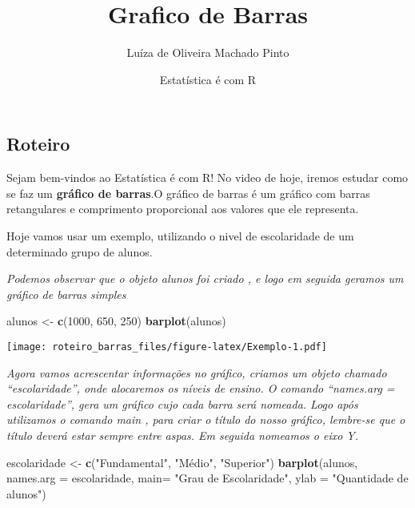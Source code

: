 \documentclass[]{article}
\title{Grafico de Barras}
\author{Luíza de Oliveira Machado Pinto}
\date{Estatística é com R}
\newenvironment{Shaded}{\begin{snugshade}}{\end{snugshade}}
\newcommand{\DataTypeTok}[1]{\textcolor[rgb]{0.13,0.29,0.53}{#1}}
\newcommand{\DecValTok}[1]{\textcolor[rgb]{0.00,0.00,0.81}{#1}}
\newcommand{\KeywordTok}[1]{\textcolor[rgb]{0.13,0.29,0.53}{\textbf{#1}}}
\newcommand{\NormalTok}[1]{#1}
\newcommand{\StringTok}[1]{\textcolor[rgb]{0.31,0.60,0.02}{#1}}
\begin{document}
\maketitle

\hypertarget{roteiro}{%
\subsection{Roteiro}\label{roteiro}}

Sejam bem-vindos ao Estatística é com R! No video de hoje, iremos
estudar como se faz um \textbf{gráfico de barras}.O gráfico de barras é
um gráfico com barras retangulares e comprimento proporcional aos
valores que ele representa.

Hoje vamos usar um exemplo, utilizando o nivel de escolaridade de um
determinado grupo de alunos.

\emph{Podemos observar que o objeto alunos foi criado , e logo em
seguida geramos um gráfico de barras simples}

\begin{Shaded}
\begin{Highlighting}[]
\NormalTok{alunos <-}\StringTok{ }\KeywordTok{c}\NormalTok{(}\DecValTok{1000}\NormalTok{, }\DecValTok{650}\NormalTok{, }\DecValTok{250}\NormalTok{)}
\KeywordTok{barplot}\NormalTok{(alunos)}
\end{Highlighting}
\end{Shaded}

\texttt{[image: roteiro\_barras\_files/figure-latex/Exemplo-1.pdf]}

\emph{Agora vamos acrescentar informações no gráfico, criamos um objeto
chamado ``escolaridade'', onde alocaremos os níveis de ensino. O comando
``names.arg = escolaridade'', gera um gráfico cujo cada barra será
nomeada. Logo após utilizamos o comando main , para criar o título do
nosso gráfico, lembre-se que o título deverá estar sempre entre aspas.
Em seguida nomeamos o eixo Y.}

\begin{Shaded}
\begin{Highlighting}[]
\NormalTok{escolaridade <-}\StringTok{ }\KeywordTok{c}\NormalTok{(}\StringTok{"Fundamental"}\NormalTok{, }\StringTok{"Médio"}\NormalTok{, }\StringTok{"Superior"}\NormalTok{)}
\KeywordTok{barplot}\NormalTok{(alunos, }\DataTypeTok{names.arg =}\NormalTok{ escolaridade, }\DataTypeTok{main=} \StringTok{"Grau de Escolaridade"}\NormalTok{,}
        \DataTypeTok{ylab =} \StringTok{"Quantidade de alunos"}\NormalTok{)}
\end{Highlighting}
\end{Shaded}
\end{document}

